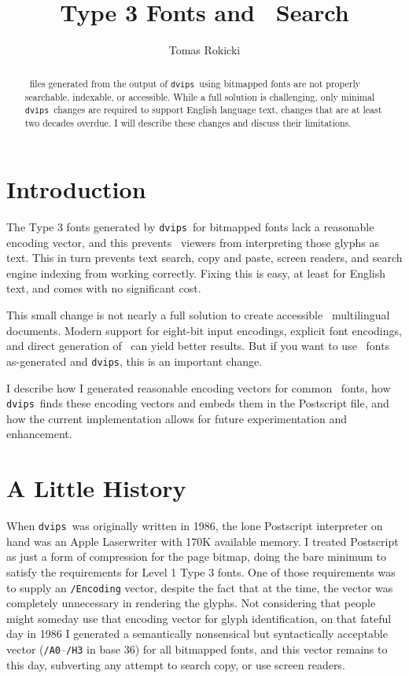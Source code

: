 \documentclass{ltugboat}
\title{Type 3 Fonts and \PDF\ Search}
\author{Tomas Rokicki}
\def\PDF{\acro{PDF}}
\def\dvips{\texttt{dvips}}
\begin{document}
\maketitle

\begin{abstract}
\PDF\ files generated from the output of \dvips\ using
bitmapped fonts are not properly searchable,
indexable, or accessible.  While a full solution is challenging,
only minimal \dvips\ changes are required to support
English language text, changes that are at least two decades overdue.
I will describe these changes and discuss their limitations.
\end{abstract}

\section{Introduction}

The Type 3 fonts generated by \dvips\ for bitmapped fonts
lack a reasonable encoding vector, and this prevents \PDF\ 
viewers from interpreting those glyphs as text.  This in turn
prevents text search, copy and paste, screen readers, and
search engine indexing from working correctly.  Fixing this is
easy, at least for English text, and comes with no significant
cost.

This small change is not nearly a full solution to create
accessible \PDF\ multilingual documents.  Modern support
for eight-bit input encodings\cite{ENC}, explicit font encodings\cite{MMAP},
and direct generation of \PDF\ can yield better results.
But if you want to use \MF\ fonts as-generated and \dvips,
this is an important change.

I describe how I generated reasonable encoding vectors
for common \MF\ fonts, how \dvips\ finds these
encoding vectors and embeds them in the Postscript file, and
how the current implementation allows for future
experimentation and enhancement.

\section{A Little History}

When \dvips\ was originally written in 1986, the lone
Postscript interpreter on hand was an Apple Laserwriter with
170K available memory.  I treated Postscript as just a form of
compression for the page bitmap, doing the bare minimum to
satisfy the requirements for Level 1 Type 3 fonts.  One of
those requirements was to supply an \texttt{/Encoding} vector,
despite the fact that at the time, the vector was completely
unnecessary in rendering the glyphs.  Not considering that people
might someday use that encoding vector for glyph identification,
on that fateful day in 1986
I generated a semantically nonsensical but syntactically acceptable
vector (\texttt{/A0}--\texttt{/H3} in base 36) for all bitmapped
fonts, and
this vector remains to this day, subverting any attempt to search
copy, or use screen readers.
\end{document}
